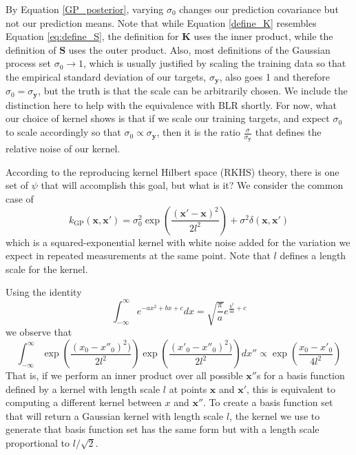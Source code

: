 \documentclass{article}
\begin{document}
By Equation \ref{GP_posterior}, varying $\sigma_0$ changes our prediction covariance but not our prediction means. Note that while Equation \ref{define_K} resembles Equation \ref{eq:define_S}, the definition for $\mathbf{K}$ uses the inner product, while the definition of $\mathbf{S}$ uses the outer product.  Also, most definitions of the Gaussian process set $\sigma_0\rightarrow 1$, which is usually justified by scaling the training data so that the empirical standard deviation of our targets, $\sigma_\mathbf{y}$, also goes 1 and therefore $\sigma_0=\sigma_\mathbf{y}$, but the truth is that the scale can be arbitrarily chosen. We include the distinction here to help with the equivalence with BLR shortly. For now, what our choice of kernel shows is that if we scale our training targets, and expect $\sigma_0$ to scale accordingly so that $\sigma_0\propto\sigma_\mathbf{y}$, then it is the ratio $\frac{\sigma}{\sigma_\mathbf{y}}$ that defines the relative noise of our kernel.

According to the reproducing kernel Hilbert space (RKHS) theory, there is one set of $\psi$ that will accomplish this goal, but what is it? We consider the common case of 
\begin{equation}
\label{kernel}
    k_\text{GP}(\mathbf{x},\mathbf{x}') = \sigma_0^2\exp\left(\frac{(\mathbf{x}'-\mathbf{x})^2}{2l^2}\right) + \sigma^2 \delta(\mathbf{x}, \mathbf{x}')
\end{equation}which is a squared-exponential kernel with white noise added for the variation we expect in repeated measurements at the same point. Note that $l$ defines a length scale for the kernel.

Using the identity 
\begin{equation}
\label{gaussian_integral_identity}
    \int_{-\infty}^{\infty}e^{-a x^2 + b x + c}dx = \sqrt{\frac{\pi}{a}}e^{\frac{b^2}{4a}+c}
\end{equation}
we observe that 
\begin{equation}
\label{eq:gaussian_integral}
    \int_{-\infty}^{\infty}\exp\left(\frac{(x_0-x''_0)^2)}{2l^2}\right)\exp\left(\frac{(x'_0-x''_0)^2)}{2l^2}\right)dx''\propto\exp\left(\frac{x_0-x'_0}{4l^2}\right)
\end{equation}That is, if we perform an inner product over all possible $\mathbf{x}''$s for a basis function defined by a kernel with length scale $l$ at points $\mathbf{x}$ and $\mathbf{x}'$, this is equivalent to computing a different kernel between $x$ and $\mathbf{x}''$. To create a basis function set that will return a Gaussian kernel with length scale $l$, the kernel we use to generate that basis function set has the same form but with a length scale proportional to  $l/\sqrt{2}$.
\end{document}
